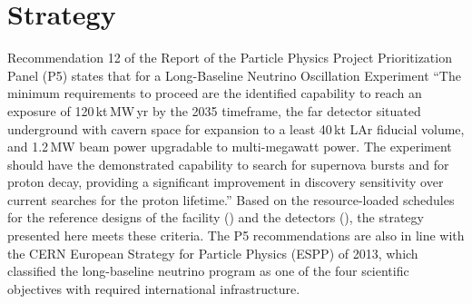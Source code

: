 
\chapter{Strategy}
\label{v1ch:strategy}

%
%
%
%
%
%
%
%


Recommendation 12 of the Report of the Particle Physics Project Prioritization Panel (P5) 
states that for a Long-Baseline Neutrino Oscillation Experiment ``The 
minimum requirements to proceed are the identified capability to reach an exposure 
of 120\,kt\,MW\,yr by the 2035 timeframe, the far detector situated underground 
with cavern space for expansion to a least 40\,kt LAr fiducial volume, and 1.2\,MW 
beam power upgradable to multi-megawatt power. The experiment should have the demonstrated 
capability to search for supernova bursts and for proton decay, providing a significant 
improvement in discovery sensitivity over current searches for the proton lifetime.'' 
Based on the resource-loaded schedules for the reference designs of the facility (\vollbnf)
and the detectors (\voldune), the strategy presented here meets these criteria. 
The P5 recommendations are also in line with the CERN European Strategy for Particle 
Physics (ESPP) of 2013, which classified the long-baseline neutrino program as 
one of the four scientific objectives with required international infrastructure.

